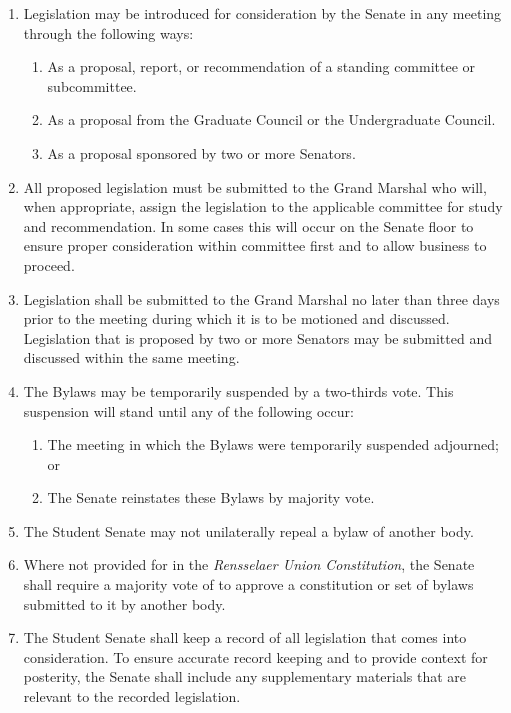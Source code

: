 
\begin{enumerate}

    \item Legislation may be introduced for consideration by the Senate in any meeting through the following ways:
    \begin{enumerate}
        \item As a proposal, report, or recommendation of a standing committee or subcommittee.
        \item As a proposal from the Graduate Council or the Undergraduate Council.
        \item As a proposal sponsored by two or more Senators.
    \end{enumerate}

    \item All proposed legislation must be submitted to the Grand Marshal who will, when appropriate, assign the legislation to the applicable committee for study and recommendation. In some cases this will occur on the Senate floor to ensure proper consideration within committee first and to allow business to proceed.

    \item Legislation shall be submitted to the Grand Marshal no later than three days prior to the meeting during which it is to be motioned and discussed. Legislation that is proposed by two or more Senators may be submitted and discussed within the same meeting.

    \item The Bylaws may be temporarily suspended by a two-thirds vote. This suspension will stand until any of the following occur:
    \begin{enumerate}
        \item The meeting in which the Bylaws were temporarily suspended adjourned; or
        \item The Senate reinstates these Bylaws by majority vote.
    \end{enumerate}

    \item The Student Senate may not unilaterally repeal a bylaw of another body.

    \item Where not provided for in the \textit{Rensselaer Union Constitution}, the Senate shall require a majority vote of to approve a constitution or set of bylaws submitted to it by another body.

    \item The Student Senate shall keep a record of all legislation that comes into consideration. To ensure accurate record keeping and to provide context for posterity, the Senate shall include any supplementary materials that are relevant to the recorded legislation.

\end{enumerate}
